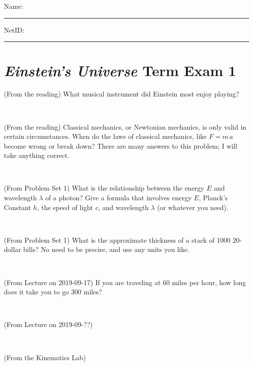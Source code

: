 \documentclass[12pt, letterpaper]{article}
\begin{document}
\noindent
Name: \rule[-1ex]{0.60\textwidth}{0.1pt}
NetID: \rule[-1ex]{0.20\textwidth}{0.1pt}

\section*{\textsl{Einstein's Universe} Term Exam 1}
\setcounter{problem}{1}


\begin{problem} (From the reading)
What musical instrument did Einstein most enjoy playing?
\end{problem}


\vfill ~

\begin{problem} (From the reading)
Classical mechanics, or Newtonian mechanics, is only valid in certain
circumstances. When do the laws of classical mechanics, like $F =
m\,a$ become wrong or break down? There are many answers to this
problem; I will take anything correct.
\end{problem}


\vfill ~

\begin{problem} (From Problem Set 1)
What is the relationship between the energy $E$ and wavelength
$\lambda$ of a photon? Give a formula that involves energy $E$,
Planck's Constant $h$, the speed of light $c$, and wavelength
$\lambda$ (or whatever you need).
\end{problem}

\vfill ~

\begin{problem} (From Problem Set 1)
What is the approximate thickness of a stack of 1000 20-dollar bills?
No need to be precise, and use any units you like.
\end{problem}


\vfill ~


\clearpage


\begin{problem} (From Lecture on 2019-09-17)
If you are traveling at 60 miles per hour, how long does
it take you to go 300 miles?
\end{problem}


\vfill ~

\begin{problem} (From Lecture on 2019-09-??)
\end{problem}


\vfill ~

\begin{problem} (From the Kinematics Lab)

\end{problem}
\end{document}
